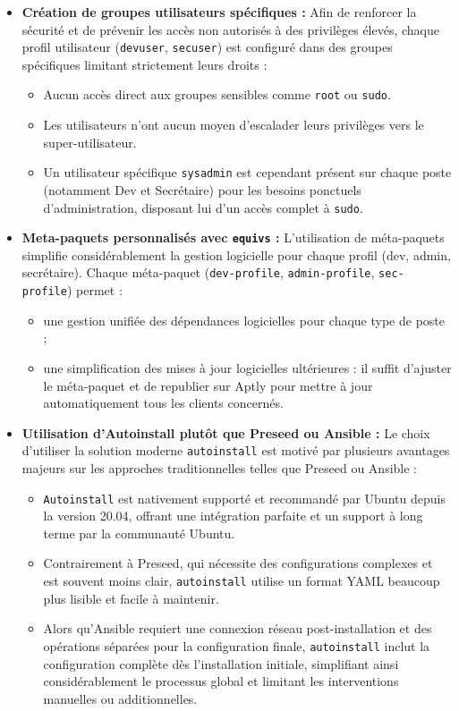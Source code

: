 \documentclass[a4paper,12pt]{article}
\begin{document}
\begin{itemize}
\item \textbf{Création de groupes utilisateurs spécifiques :} 
Afin de renforcer la sécurité et de prévenir les accès non autorisés à des privilèges élevés, chaque profil utilisateur (\texttt{devuser}, \texttt{secuser}) est configuré dans des groupes spécifiques limitant strictement leurs droits :
\begin{itemize}
    \item Aucun accès direct aux groupes sensibles comme \texttt{root} ou \texttt{sudo}.
    \item Les utilisateurs n'ont aucun moyen d'escalader leurs privilèges vers le super-utilisateur.
    \item Un utilisateur spécifique \texttt{sysadmin} est cependant présent sur chaque poste (notamment Dev et Secrétaire) pour les besoins ponctuels d'administration, disposant lui d'un accès complet à \texttt{sudo}.
\end{itemize}

\item \textbf{Meta-paquets personnalisés avec \texttt{equivs} :} 
L'utilisation de méta-paquets simplifie considérablement la gestion logicielle pour chaque profil (dev, admin, secrétaire). Chaque méta-paquet (\texttt{dev-profile}, \texttt{admin-profile}, \texttt{sec-profile}) permet :
\begin{itemize}
    \item une gestion unifiée des dépendances logicielles pour chaque type de poste ;
    \item une simplification des mises à jour logicielles ultérieures : il suffit d'ajuster le méta-paquet et de republier sur Aptly pour mettre à jour automatiquement tous les clients concernés.
\end{itemize}

\item \textbf{Utilisation d’Autoinstall plutôt que Preseed ou Ansible :} 
Le choix d’utiliser la solution moderne \texttt{autoinstall} est motivé par plusieurs avantages majeurs sur les approches traditionnelles telles que Preseed ou Ansible :
\begin{itemize}
    \item \texttt{Autoinstall} est nativement supporté et recommandé par Ubuntu depuis la version 20.04, offrant une intégration parfaite et un support à long terme par la communauté Ubuntu.
    \item Contrairement à Preseed, qui nécessite des configurations complexes et est souvent moins clair, \texttt{autoinstall} utilise un format YAML beaucoup plus lisible et facile à maintenir.
    \item Alors qu'Ansible requiert une connexion réseau post-installation et des opérations séparées pour la configuration finale, \texttt{autoinstall} inclut la configuration complète dès l’installation initiale, simplifiant ainsi considérablement le processus global et limitant les interventions manuelles ou additionnelles.
\end{itemize}

\end{itemize}
\end{document}
